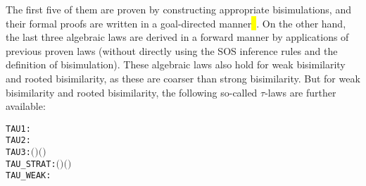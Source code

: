 The first five of them are proven by constructing appropriate bisimulations,
and their formal proofs are written in
a goal-directed manner\hl{\mbox{~\citep[Chapter 4]{holdesc}}}. On the other hand, the
last three algebraic laws are derived in a forward manner by applications of
previous proven laws (without directly using the SOS
inference rules and the definition of bisimulation).
 These algebraic laws also hold for weak bisimilarity and rooted
  bisimilarity, as these are coarser than strong bisimilarity. But
for weak bisimilarity and rooted bisimilarity, the following so-called
$\tau$-laws are further available:
\begin{alltt}
TAU1:      \HOLTokenTurnstile{} \HOLSymConst{\ensuremath{\ldotp}}\HOLSymConst{\ensuremath{\tau}}\HOLSymConst{\ensuremath{\ldotp}} \HOLSymConst{\HOLTokenObsCongr} \HOLSymConst{\ensuremath{\ldotp}}
TAU2:      \HOLTokenTurnstile{}  \HOLSymConst{\ensuremath{+}} \HOLSymConst{\ensuremath{\tau}}\HOLSymConst{\ensuremath{\ldotp}} \HOLSymConst{\HOLTokenObsCongr} \HOLSymConst{\ensuremath{\tau}}\HOLSymConst{\ensuremath{\ldotp}}
TAU3:      \HOLTokenTurnstile{} \HOLSymConst{\ensuremath{\ldotp}}\ensuremath{(} \HOLSymConst{\ensuremath{+}} \HOLSymConst{\ensuremath{\tau}}\HOLSymConst{\ensuremath{\ldotp}}\ensuremath{)} \HOLSymConst{\ensuremath{+}} \HOLSymConst{\ensuremath{\ldotp}} \HOLSymConst{\HOLTokenObsCongr} \HOLSymConst{\ensuremath{\ldotp}}\ensuremath{(} \HOLSymConst{\ensuremath{+}} \HOLSymConst{\ensuremath{\tau}}\HOLSymConst{\ensuremath{\ldotp}}\ensuremath{)}
TAU_STRAT: \HOLTokenTurnstile{}  \HOLSymConst{\ensuremath{+}} \HOLSymConst{\ensuremath{\tau}}\HOLSymConst{\ensuremath{\ldotp}}\ensuremath{(} \HOLSymConst{\ensuremath{+}} \ensuremath{)} \HOLSymConst{\HOLTokenObsCongr} \HOLSymConst{\ensuremath{\tau}}\HOLSymConst{\ensuremath{\ldotp}}\ensuremath{(} \HOLSymConst{\ensuremath{+}} \ensuremath{)}
TAU_WEAK:  \HOLTokenTurnstile{} \HOLSymConst{\ensuremath{\tau}}\HOLSymConst{\ensuremath{\ldotp}} \HOLSymConst{\HOLTokenWeakEQ} 
\end{alltt}

